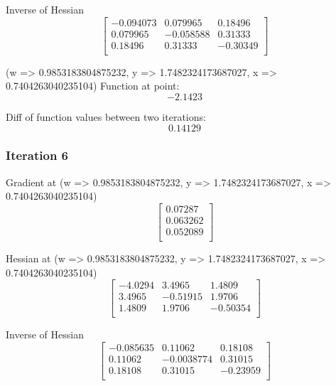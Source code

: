 \documentclass{article}
\begin{document}
Inverse of Hessian
\begin{equation}
\left[
\begin{array}{ccc}
-0.094073 & 0.079965 & 0.18496 \\
0.079965 & -0.058588 & 0.31333 \\
0.18496 & 0.31333 & -0.30349 \\
\end{array}
\right]
\end{equation}

(w => 0.9853183804875232, y => 1.7482324173687027, x => 0.7404263040235104)
Function at point:
\begin{equation}
-2.1423
\end{equation}

Diff of function values between two iterations:
\begin{equation}
0.14129
\end{equation}

\subsubsection{Iteration 6}
Gradient at (w => 0.9853183804875232, y => 1.7482324173687027, x => 0.7404263040235104)
\begin{equation}
\left[
\begin{array}{c}
0.07287 \\
0.063262 \\
0.052089 \\
\end{array}
\right]
\end{equation}

Hessian at (w => 0.9853183804875232, y => 1.7482324173687027, x => 0.7404263040235104)
\begin{equation}
\left[
\begin{array}{ccc}
-4.0294 & 3.4965 & 1.4809 \\
3.4965 & -0.51915 & 1.9706 \\
1.4809 & 1.9706 & -0.50354 \\
\end{array}
\right]
\end{equation}

Inverse of Hessian
\begin{equation}
\left[
\begin{array}{ccc}
-0.085635 & 0.11062 & 0.18108 \\
0.11062 & -0.0038774 & 0.31015 \\
0.18108 & 0.31015 & -0.23959 \\
\end{array}
\right]
\end{equation}
\end{document}
